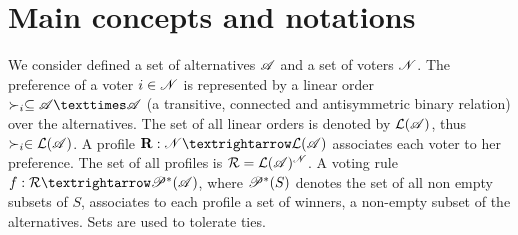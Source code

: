 \documentclass[version=last, pagesize, twoside=off, bibliography=totoc, DIV=calc, fontsize=12pt, a4paper, french, english]{scrartcl}
\begin{document}
\section{Main concepts and notations}
We consider defined a set of alternatives $\mathscr{A}$ and a set of voters $\mathscr{N}$. The preference of a voter $i \in \mathscr{N}$ is represented by a linear order $\pref_i \subseteq \allalts × \allalts$ (a transitive, connected and antisymmetric binary relation) over the alternatives. The set of all linear orders is denoted by $\mathcal{L}(\mathscr{A})$, thus $\succ_i \in \mathcal{L}(\mathscr{A})$. A profile $\prof: \allvoters → \linors$ associates each voter to her preference. The set of all profiles is $\mathcal{R} = \mathcal{L}(\mathscr{A})^{\mathscr{N}}$. A voting rule $f: \allprofs → \powersetz{\allalts}$, where $\mathscr{P}^*(S)$ denotes the set of all non empty subsets of $S$, associates to each profile a set of winners, a non-empty subset of the alternatives. Sets are used to tolerate ties.
\end{document}
